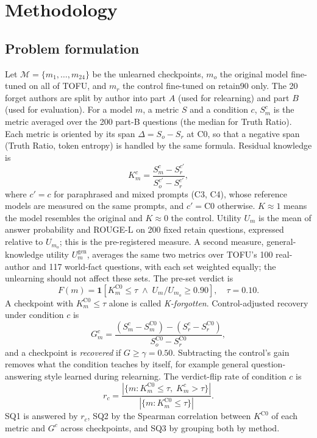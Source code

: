 \documentclass[conference]{IEEEtran}
\begin{document}
\section{Methodology}\label{sec:method}
\subsection{Problem formulation}
Let $\mathcal{M}=\{m_1,\dots,m_{24}\}$ be the unlearned checkpoints, $m_o$ the original model fine-tuned on all of TOFU, and $m_r$ the control fine-tuned on retain90 only. The 20 forget authors are split by author into part $A$ (used for relearning) and part $B$ (used for evaluation). For a model $m$, a metric $S$ and a condition $c$, $S_m^{c}$ is the metric averaged over the 200 part-B questions (the median for Truth Ratio). Each metric is oriented by its span $\Delta=S_o-S_r$ at C0, so that a negative span (Truth Ratio, token entropy) is handled by the same formula. Residual knowledge is
\begin{equation}
K_m^{c}=\frac{S_m^{c}-S_r^{c'}}{S_o^{c'}-S_r^{c'}},\label{eq:K}
\end{equation}
where $c'=c$ for paraphrased and mixed prompts (C3, C4), whose reference models are measured on the same prompts, and $c'=\mathrm{C0}$ otherwise. $K\approx1$ means the model resembles the original and $K\approx0$ the control. Utility $U_m$ is the mean of answer probability and ROUGE-L on 200 fixed retain questions, expressed relative to $U_{m_o}$; this is the pre-registered measure. A second measure, general-knowledge utility $U^{\mathrm{gen}}_m$, averages the same two metrics over TOFU's 100 real-author and 117 world-fact questions, with each set weighted equally; the unlearning should not affect these sets. The pre-set verdict is
\begin{equation}
F(m)=\mathbf{1}\left[K_m^{\mathrm{C0}}\le\tau \;\wedge\; U_m/U_{m_o}\ge0.90\right],\quad \tau=0.10.\label{eq:F}
\end{equation}
A checkpoint with $K_m^{\mathrm{C0}}\le\tau$ alone is called \emph{K-forgotten}. Control-adjusted recovery under condition $c$ is
\begin{equation}
G_m^{c}=\frac{(S_m^{c}-S_m^{\mathrm{C0}})-(S_r^{c}-S_r^{\mathrm{C0}})}{S_o^{\mathrm{C0}}-S_r^{\mathrm{C0}}},\label{eq:G}
\end{equation}
and a checkpoint is \emph{recovered} if $G\ge\gamma=0.50$. Subtracting the control's gain removes what the condition teaches by itself, for example general question-answering style learned during relearning. The verdict-flip rate of condition $c$ is
\begin{equation}
r_c=\frac{|\{m: K_m^{\mathrm{C0}}\le\tau,\;K_m^{c}>\tau\}|}{|\{m: K_m^{\mathrm{C0}}\le\tau\}|}.\label{eq:r}
\end{equation}
SQ1 is answered by $r_c$, SQ2 by the Spearman correlation between $K^{\mathrm{C0}}$ of each metric and $G^{c}$ across checkpoints, and SQ3 by grouping both by method.
\end{document}
